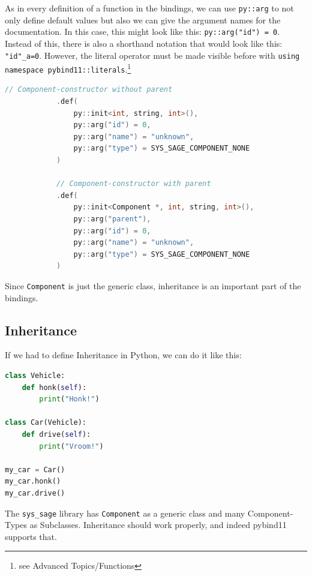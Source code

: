 As in every definition of a function in the bindings, we can use \verb|py::arg| to not only define default values but also we can give the argument names for the documentation. In this case, this might look like this: \verb|py::arg("id") = 0|. Instead of this, there is also a shorthand notation that would look like this: \verb|"id"_a=0|. However, the literal operator must be made visible before with \verb|using namespace pybind11::literals|.\cite{pybind11-docu}\footnote{see Advanced Topics/Functions\label{fn:advanced}}

\begin{lstlisting}[language=C++, xleftmargin=4em, frame = single]
            // Component-constructor without parent
            .def(
                py::init<int, string, int>(),
                py::arg("id") = 0,
                py::arg("name") = "unknown",
                py::arg("type") = SYS_SAGE_COMPONENT_NONE
            )
            
            // Component-constructor with parent
            .def(
                py::init<Component *, int, string, int>(),
                py::arg("parent"),
                py::arg("id") = 0,
                py::arg("name") = "unknown",
                py::arg("type") = SYS_SAGE_COMPONENT_NONE
            )
\end{lstlisting}
\smallskip
Since \verb|Component| is just the generic class, inheritance is an important part of the bindings.

\subsection{Inheritance}

If we had to define Inheritance in Python, we can do it like this:
\begin{lstlisting}[language=Python, xleftmargin=4em, frame = single]
class Vehicle:
    def honk(self):
        print("Honk!")

class Car(Vehicle):
    def drive(self):
        print("Vroom!")

my_car = Car()
my_car.honk()
my_car.drive()
\end{lstlisting}

The \verb|sys_sage| library has \verb|Component| as a generic class and many Component-Types as Subclasses. Inheritance should work properly, and indeed pybind11 supports that.

